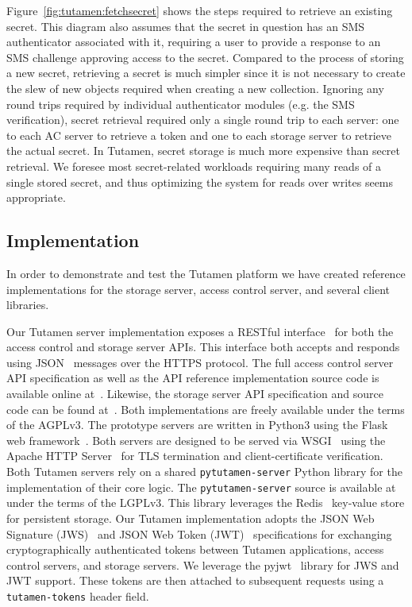 Figure~\ref{fig:tutamen:fetchsecret} shows the steps required to
retrieve an existing secret. This diagram also assumes that the secret
in question has an SMS authenticator associated with it, requiring a
user to provide a response to an SMS challenge approving access to the
secret. Compared to the process of storing a new secret, retrieving a
secret is much simpler since it is not necessary to create the slew of
new objects required when creating a new collection. Ignoring any
round trips required by individual authenticator modules (e.g. the SMS
verification), secret retrieval required only a single round trip to
each server: one to each AC server to retrieve a token and one to each
storage server to retrieve the actual secret. In Tutamen, secret
storage is much more expensive than secret retrieval. We foresee most
secret-related workloads requiring many reads of a single stored
secret, and thus optimizing the system for reads over writes seems
appropriate.

\subsection{Implementation}

In order to demonstrate and test the Tutamen platform we have created
reference implementations for the storage server, access control
server, and several client libraries.

Our Tutamen server implementation exposes a RESTful
interface~\cite{fielding2000} for both the access control and storage
server APIs. This interface both accepts and responds using
JSON~\cite{json} messages over the HTTPS protocol. The full access
control server API specification as well as the API reference
implementation source code is available online
at~\cite{src-tutamen-apiaccesscontrol}. Likewise, the storage server
API specification and source code can be found
at~\cite{src-tutamen-apistorage}. Both implementations are freely
available under the terms of the AGPLv3. The prototype servers are
written in Python3 using the Flask web
framework~\cite{python-flask}. Both servers are designed to be served
via WSGI~\cite{pep3333} using the Apache HTTP Server~\cite{apache} for
TLS termination and client-certificate verification. Both Tutamen
servers rely on a shared \texttt{pytutamen-server} Python library for
the implementation of their core logic. The \texttt{pytutamen-server}
source is available at~\cite{src-tutamen-pytutamenserver} under the
terms of the LGPLv3. This library leverages the Redis~\cite{redis}
key-value store for persistent storage. Our Tutamen implementation
adopts the JSON Web Signature (JWS)~\cite{rfc7515} and JSON Web Token
(JWT)~\cite{rfc7519} specifications for exchanging cryptographically
authenticated tokens between Tutamen applications, access control
servers, and storage servers. We leverage the pyjwt~\cite{pyjwt}
library for JWS and JWT support. These tokens are then attached to
subsequent requests using a \texttt{tutamen-tokens} header field.

